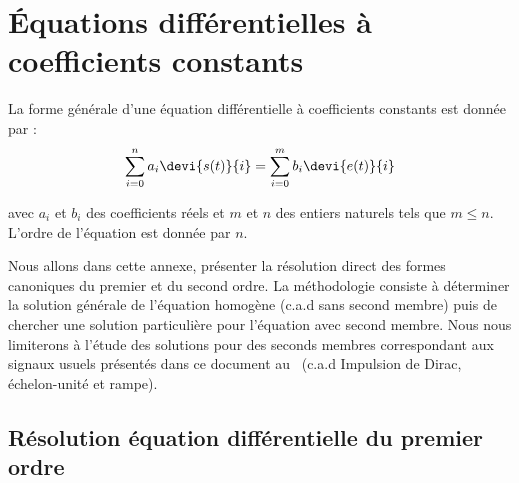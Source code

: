 \chapter{Équations différentielles à coefficients constants
        \label{annexe-eqndiff}}
La forme générale d'une équation différentielle à coefficients constants est 
donnée par :
\begin{align}
\sum_{i=0}^{n}a_i\devi{s(t)}{i}=\sum_{i=0}^{m}b_i\devi{e(t)}{i}
\end{align}

avec $a_i$ et $b_i$ des coefficients réels et $m$ et $n$ des entiers naturels 
tels que $m\le n$. L'ordre de l'équation est donnée par $n$.

Nous allons dans cette annexe, présenter la résolution direct 
des formes canoniques du premier et du second ordre. La méthodologie consiste
à déterminer la solution générale de l'équation homogène (c.a.d sans second 
membre) puis de chercher une solution particulière pour l'équation avec second 
membre. Nous nous limiterons à l'étude des solutions pour des seconds membres 
correspondant aux signaux usuels présentés dans ce document 
au~ (c.a.d Impulsion de Dirac, échelon-unité et rampe).

\section{Résolution équation différentielle du premier ordre}

